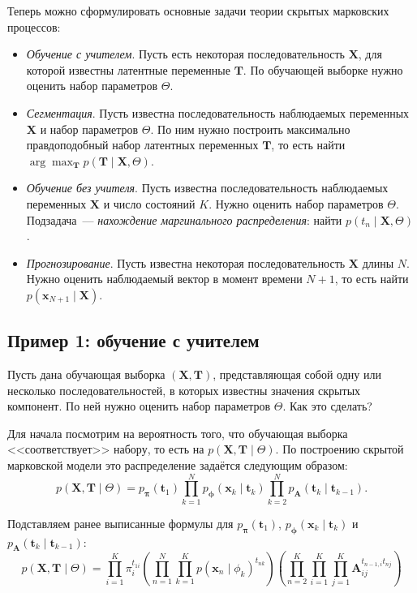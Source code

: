 Теперь можно сформулировать основные задачи теории скрытых марковских процессов:
\begin{itemize}
	\item \emph{Обучение с учителем}. Пусть есть некоторая последовательность 
	\(\mathbf{X}\), для которой известны латентные переменные \(\mathbf{T}\). 
	По обучающей выборке нужно оценить набор параметров \(\Theta\).
	\item \emph{Сегментация}. Пусть известна последовательность наблюдаемых 
	переменных \(\mathbf{X}\) и набор параметров \(\Theta\). По ним нужно 
	построить максимально правдоподобный набор латентных переменных 
	\(\mathbf{T}\), то есть найти \(\arg\max_{\mathbf{T}} p(\mathbf{T} \mid 
	\mathbf{X}, \Theta)\).
	\item \emph{Обучение без учителя}. Пусть известна последовательность 
	наблюдаемых переменных \(\mathbf{X}\) и число состояний \(K\). Нужно 
	оценить набор параметров \(\Theta\). Подзадача~--- \emph{нахождение 
	маргинального распределения}: найти \(p(t_{n} \mid \mathbf{X}, \Theta)\).
	\item \emph{Прогнозирование}. Пусть известна некоторая последовательность 
	\(\mathbf{X}\) длины \(N\). Нужно оценить наблюдаемый вектор в момент 
	времени \(N + 1\), то есть найти \(p(\mathbf{x}_{N + 1} \mid \mathbf{X})\).
\end{itemize}

\subsection{Пример 1: обучение с учителем}
Пусть дана обучающая выборка \((\mathbf{X}, \mathbf{T})\), представляющая 
собой одну или несколько последовательностей, в которых известны значения 
скрытых компонент. По ней нужно оценить набор параметров \(\Theta\). Как это 
сделать?

Для начала посмотрим на вероятность того, что обучающая выборка 
<<соответствует>> набору, то есть на \(p(\mathbf{X}, \mathbf{T} \mid \Theta)\). 
По построению скрытой марковской модели это распределение задаётся следующим 
образом:
\[
	p(\mathbf{X}, \mathbf{T} \mid \Theta) = 
	p_{\bm{\pi}}(\mathbf{t}_{1})\prod_{k = 1}^{N}p_{\bm{\phi}}(\mathbf{x}_{k} 
	\mid \mathbf{t}_{k})\prod_{k = 2}^{N}p_{\mathbf{A}}(\mathbf{t}_{k} \mid 
	\mathbf{t}_{k - 1}).
\]

Подставляем ранее выписанные формулы для \(p_{\bm{\pi}}(\mathbf{t}_{1})\), 
\(p_{\bm{\phi}}(\mathbf{x}_{k} \mid \mathbf{t}_{k})\) и 
\(p_{\mathbf{A}}(\mathbf{t}_{k} \mid \mathbf{t}_{k - 1})\):
\[
	p(\mathbf{X}, \mathbf{T} \mid \Theta) = \prod_{i = 1}^{K} 
	\pi_{i}^{t_{1i}}\left(\prod_{n = 1}^{N}\prod_{k = 1}^{K} p(\mathbf{x}_{n} 
	\mid \phi_{k})^{t_{nk}}\right)\left(\prod_{n = 2}^{K}\prod_{i = 
	1}^{K}\prod_{j = 1}^{K} \mathbf{A}_{ij}^{t_{n - 1, i}t_{nj}}\right)
\]

